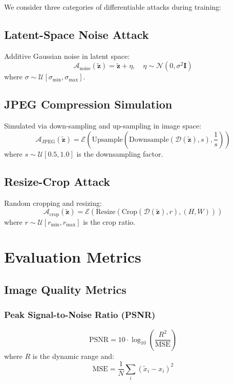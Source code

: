 \documentclass[11pt]{article}
\begin{document}
We consider three categories of differentiable attacks during training:

\subsection{Latent-Space Noise Attack}

Additive Gaussian noise in latent space:
\begin{equation}
    \mathcal{A}_{\text{noise}}(\tilde{\mathbf{z}}) = \tilde{\mathbf{z}} + \eta, \quad \eta \sim \mathcal{N}(0, \sigma^2 \mathbf{I})
\end{equation}
where $\sigma \sim \mathcal{U}[\sigma_{\min}, \sigma_{\max}]$.

\subsection{JPEG Compression Simulation}

Simulated via down-sampling and up-sampling in image space:
\begin{equation}
    \mathcal{A}_{\text{JPEG}}(\tilde{\mathbf{z}}) = \mathcal{E}\left(\text{Upsample}\left(\text{Downsample}\left(\mathcal{D}(\tilde{\mathbf{z}}), s\right), \frac{1}{s}\right)\right)
\end{equation}
where $s \sim \mathcal{U}[0.5, 1.0]$ is the downsampling factor.

\subsection{Resize-Crop Attack}

Random cropping and resizing:
\begin{equation}
    \mathcal{A}_{\text{crop}}(\tilde{\mathbf{z}}) = \mathcal{E}\left(\text{Resize}\left(\text{Crop}\left(\mathcal{D}(\tilde{\mathbf{z}}), r\right), (H, W)\right)\right)
\end{equation}
where $r \sim \mathcal{U}[r_{\min}, r_{\max}]$ is the crop ratio.

\section{Evaluation Metrics}

\subsection{Image Quality Metrics}

\subsubsection{Peak Signal-to-Noise Ratio (PSNR)}
\begin{equation}
    \text{PSNR} = 10 \cdot \log_{10}\left(\frac{R^2}{\text{MSE}}\right)
\end{equation}
where $R$ is the dynamic range and:
\begin{equation}
    \text{MSE} = \frac{1}{N}\sum_i(\tilde{x}_i - x_i)^2
\end{equation}
\end{document}
